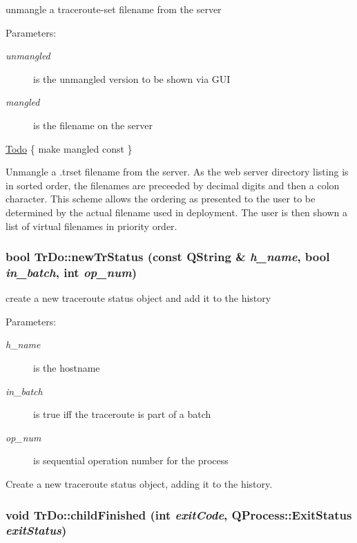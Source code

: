 unmangle a traceroute-set filename from the server \begin{Desc}
\item[Parameters:]
\begin{description}
\item[{\em unmangled}]is the unmangled version to be shown via GUI \item[{\em mangled}]is the filename on the server \end{description}
\end{Desc}
\begin{Desc}
\item[\hyperlink{todo__todo000003}{Todo}]\{ make mangled const \} \end{Desc}
Unmangle a .trset filename from the server. As the web server directory listing is in sorted order, the filenames are preceeded by decimal digits and then a colon character. This scheme allows the ordering as presented to the user to be determined by the actual filename used in deployment. The user is then shown a list of virtual filenames in priority order. \hypertarget{classTrDo_049d408bb8a464a9e8f69c2b1f909c14}{
\subsubsection[newTrStatus]{\setlength{\rightskip}{0pt plus 5cm}bool TrDo::newTrStatus (const QString \& {\em h\_\-name}, \/  bool {\em in\_\-batch}, \/  int {\em op\_\-num})}}
\label{classTrDo_049d408bb8a464a9e8f69c2b1f909c14}


create a new traceroute status object and add it to the history \begin{Desc}
\item[Parameters:]
\begin{description}
\item[{\em h\_\-name}]is the hostname \item[{\em in\_\-batch}]is true iff the traceroute is part of a batch \item[{\em op\_\-num}]is sequential operation number for the process\end{description}
\end{Desc}
Create a new traceroute status object, adding it to the history. \hypertarget{classTrDo_4a43dbd440bd3dcbf747be138086b293}{
\subsubsection[childFinished]{\setlength{\rightskip}{0pt plus 5cm}void TrDo::childFinished (int {\em exitCode}, \/  QProcess::ExitStatus {\em exitStatus})}}
\label{classTrDo_4a43dbd440bd3dcbf747be138086b293}


